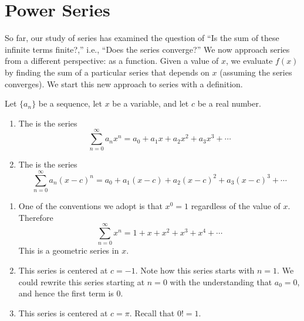 \section{Power Series}\label{sec:power_series}

So far, our study of series has examined the question of ``Is the sum of these infinite terms finite?,'' i.e., ``Does the series converge?'' We now approach series from a different perspective: as a function. Given a value of $x$, we evaluate $f(x)$ by finding the sum of a particular series that depends on $x$ (assuming the series converges). We start this new approach to series with a definition.

{Let $\{a_n\}$ be a sequence, let $x$ be a variable, and let $c$ be a real number.
	\begin{enumerate}
		\item The  is the series
		$$\sum_{n=0}^\infty a_nx^n = a_0+a_1x+a_2x^2+a_3x^3+\dotsb$$
		
		\item The  is the series
		$$\sum_{n=0}^\infty a_n(x-c)^n = a_0+a_1(x-c)+a_2(x-c)^2+a_3(x-c)^3+\dotsb$$
	\end{enumerate}
}

{\begin{enumerate}
	\item One of the conventions we adopt is that $x^0=1$ regardless of the value of $x$. Therefore
	$$\sum_{n=0}^\infty x^n = 1+x+x^2+x^3+x^4+\dotsb$$
	This is a geometric series in $x$.
	
	\item	This series is centered at $c=-1$. Note how this series starts with $n=1$. We could rewrite this series starting at $n=0$ with the understanding that $a_0=0$, and hence the first term is $0$.\\
	
	\item		This series is centered at $c=\pi$. Recall that $0!=1$.\\
\end{enumerate}}

